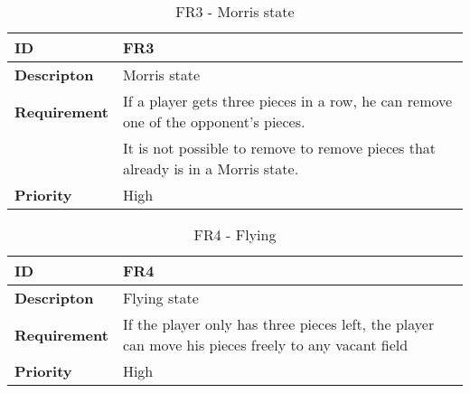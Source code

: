 
\begin{table}[h!]
\begin{tabular}{ | p{90pt} | p{270pt}  |}
\hline
\bf ID &  FR3  \\ \hline
\bf Descripton & Morris state \\ \hline 
\bf Requirement & If a player gets three pieces in a row, he can remove one of the opponent's pieces.  \\
& It is not possible to remove to remove pieces that already is in a Morris state. \\ \hline
\bf Priority & High \\ \hline

\end{tabular}

\caption{FR3 - Morris state}

\end{table}


\begin{table}[h!]
\begin{tabular}{ | p{90pt} | p{270pt}  |}
\hline
\bf ID &  FR4  \\ \hline
\bf Descripton & Flying state \\ \hline 
\bf Requirement & If the player only has three pieces left, the player can move his pieces freely to any vacant field \\ \hline
\bf Priority & High \\ \hline

\end{tabular}

\caption{FR4 - Flying}

\end{table}


